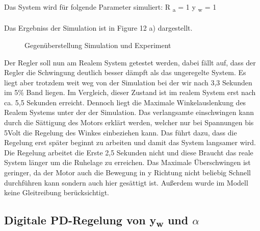\documentclass[10pt]{scrartcl}
\begin{document}
\\Das System wird für folgende Parameter simuliert:
R \textsubscript{a} = 1
 y \textsubscript{w} = 1\\
\\Das Ergebniss der Simulation ist in Figure 12 a) dargestellt. 
\begin{figure} [H]
\caption{ Gegenüberstellung Simulation und Experiment} 
\end{figure}
Der Regler soll nun am Realem System getestet werden, dabei fällt auf, dass
der Regler die Schwingung deutlich besser  dämpft  als das ungeregelte System. Es liegt aber trotzdem weit weg von der Simulation bei der wir nach 3,3 Sekunden im 5\% Band liegen. Im Vergleich, dieser Zustand ist im realem System erst nach ca. 5,5 Sekunden erreicht. Dennoch liegt die Maximale Winkelauslenkung des Realem Systems unter der der Simulation. Das verlangsamte einschwingen kann durch die Sättigung des Motors erklärt werden, welcher nur bei Spannungen bis 5Volt die Regelung des Winkes einbeziehen kann. Das führt dazu, dass die Regelung erst später beginnt zu arbeiten und damit das System langsamer wird. Die Regelung arbeitet die Erste 2,5 Sekunden nicht und diese Braucht das reale System länger um die Ruhelage zu erreichen. Das Maximale Überschwingen ist geringer, da der Motor auch die Bewegung in y Richtung nicht beliebig Schnell durchführen kann sondern auch hier gesättigt ist. Außerdem wurde im Modell keine Gleitreibung berücksichtigt.\\
\subsection{Digitale PD-Regelung von  y\textsubscript{w} und $\alpha$}
\end{document}
